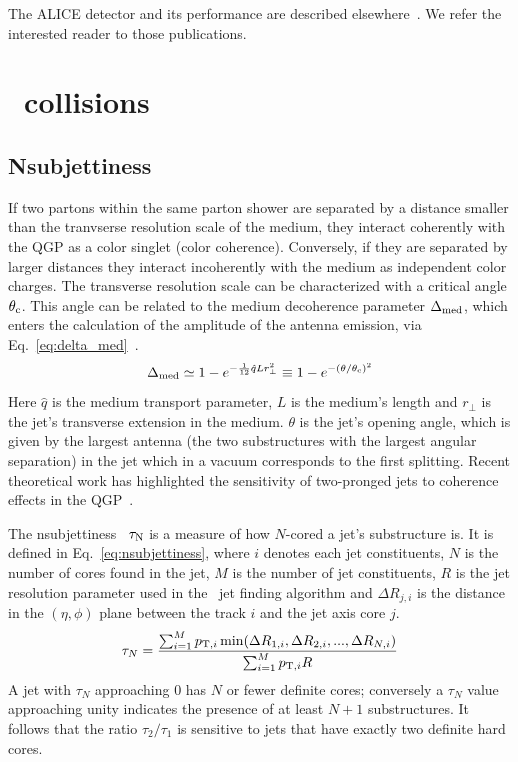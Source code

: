 \documentclass[10pt]{article}
\begin{document}
The ALICE detector and its performance are described elsewhere~\cite{ALICE:2008, ALICE:2014b}. We refer the interested reader to those publications.

\section{\PbPb\ collisions}

\subsection{Nsubjettiness}
\label{sect:nsubjettiness}
If two partons within the same parton shower are separated by a distance smaller than the tranvserse resolution scale of the medium, they interact coherently with the QGP as a color singlet (color coherence). 
Conversely, if they are separated by larger distances they interact incoherently with the medium as independent color charges.
The transverse resolution scale can be characterized with a critical angle $\theta_{\rm c}$. This angle can be related to the medium decoherence parameter $\Delta_{\rm med}$, which enters the calculation of the amplitude of the antenna emission, via Eq.~\ref{eq:delta_med}~\cite{Mehtar-Tani:2012, Casalderrey-Solana:2013}.
\begin{equation}
\Delta_{\rm med} \simeq 1 - e^{-\frac{1}{12}\hat{q}Lr^2_{\bot}} \equiv 1 - e^{-(\theta/\theta_{\rm c})^2}
\label{eq:delta_med}
\end{equation}
Here $\hat{q}$ is the medium transport parameter, $L$ is the medium's
length and $r_{\bot}$ is the jet's transverse extension in the medium. $\theta$ is the jet's opening angle, which is given by
the largest antenna (the two substructures with the largest angular separation) in the jet which in a vacuum
corresponds to the first splitting. Recent theoretical work has highlighted the sensitivity of two-pronged jets
to coherence effects in the QGP~\cite{Mehtar-Tani:2016}.

The nsubjettiness~\cite{Thaler:2010} $\tau_{\rm N}$ is a measure of how $N$-cored a jet's substructure is. It is defined in Eq.~\ref{eq:nsubjettiness}, where
$i$ denotes each jet constituents, $N$ is the number of cores found in the jet, $M$ is the number of jet constituents, $R$ is the jet resolution parameter used in the \kt\ jet finding algorithm
and $\Delta R_{j,i}$ is the distance in the $(\eta,\phi)$ plane between the track $i$ and the jet axis core $j$.
\begin{equation}
\tau_N = \frac{\sum^M_{i=1}p_{{\rm T},i}\min(\Delta R_{1,i},\Delta R_{2,i},...,\Delta R_{N,i})}{\sum^M_{i=1}p_{{\rm T},i}R}
\label{eq:nsubjettiness}
\end{equation}
A jet with $\tau_N$ approaching $0$ 
has $N$ or fewer definite cores; conversely a $\tau_N$ value
approaching unity indicates the presence of at least $N + 1$ substructures. 
It follows that the ratio $\tau_2/\tau_1$ is sensitive to jets that have exactly two definite hard cores. 
\end{document}
